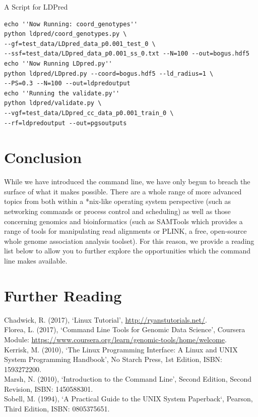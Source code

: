\documentclass[11pt]{article}
\begin{document}
\begin{listing}[H]
\caption{A Script for LDPred}\vspace{-0.1in}
\begin{verbatim}
echo ''Now Running: coord_genotypes''
python ldpred/coord_genotypes.py \ 
--gf=test_data/LDpred_data_p0.001_test_0 \
--ssf=test_data/LDpred_data_p0.001_ss_0.txt --N=100 --out=bogus.hdf5
echo ''Now Running LDpred.py''
python ldpred/LDpred.py --coord=bogus.hdf5 --ld_radius=1 \
--PS=0.3 --N=100 --out=ldpredoutput
echo ''Running the validate.py''
python ldpred/validate.py \
--vgf=test_data/LDpred_cc_data_p0.001_train_0 \
--rf=ldpredoutput --out=pgsoutputs
\end{verbatim}
\end{listing}
\section{Conclusion} 

While we have introduced the command line, we have only begun to breach the surface of what it makes possible. There are a whole range of more advanced topics from both within a *nix-like operating system perspective (such as networking commands or process control and scheduling) as well as those concerning genomics and bioinformatics (such as SAMTools which provides a range of tools for manipulating read alignments or PLINK,  a free, open-source whole genome association analysis toolset). For this reason, we provide a reading list below to allow you to further explore the opportunities which the command line makes available.

\section{Further Reading}


\noindent
Chadwick, R. (2017), `Linux Tutorial', \url{http://ryanstutorials.net/}.\\

\noindent
Florea, L. (2017), `Command Line Tools for Genomic Data Science', Coursera Module: \url{https://www.coursera.org/learn/genomic-tools/home/welcome}.\\

\noindent
Kerrisk, M. (2010), `The Linux Programming Interface: A Linux and UNIX System Programming Handbook', No Starch Press, 1st Edition, ISBN: 1593272200. \\

\noindent
Marsh, N. (2010), `Introduction to the Command Line', Second Edition, Second Revision, ISBN: 1450588301.\\

\noindent
Sobell, M. (1994), `A Practical Guide to the UNIX System Paperback`, Pearson, Third Edition,  ISBN: 0805375651.\\
\end{document}
